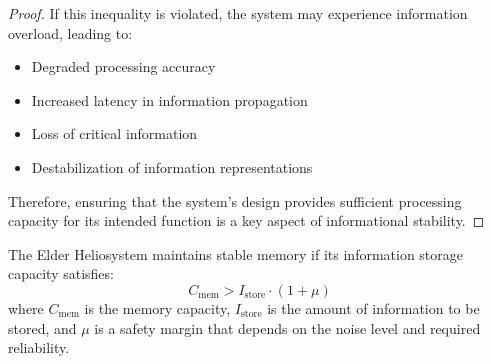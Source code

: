 \begin{proof}
If this inequality is violated, the system may experience information overload, leading to:
\begin{itemize}
    \item Degraded processing accuracy
    \item Increased latency in information propagation
    \item Loss of critical information
    \item Destabilization of information representations
\end{itemize}

Therefore, ensuring that the system's design provides sufficient processing capacity for its intended function is a key aspect of informational stability.
\end{proof}

\begin{theorem}
The Elder Heliosystem maintains stable memory if its information storage capacity satisfies:
\begin{equation}
C_{\text{mem}} > I_{\text{store}} \cdot (1 + \mu)
\end{equation}
where $C_{\text{mem}}$ is the memory capacity, $I_{\text{store}}$ is the amount of information to be stored, and $\mu$ is a safety margin that depends on the noise level and required reliability.
\end{theorem}

